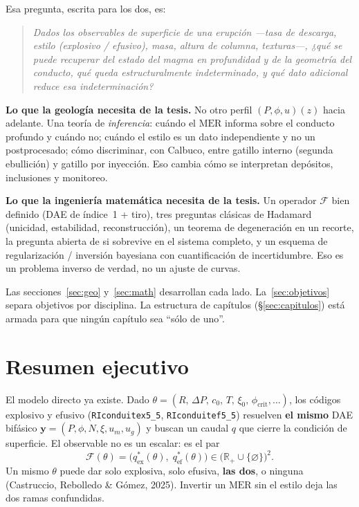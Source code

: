 \documentclass[11pt,a4paper]{article}
\theoremstyle{plain}
\theoremstyle{definition}
\theoremstyle{remark}
\newcommand{\MER}{\mathrm{MER}}
\newcommand{\F}{\mathcal{F}}
\newcommand{\R}{\mathbb{R}}
\begin{document}
Esa pregunta, escrita para los dos, es:

\begin{quote}
\textit{Dados los observables de superficie de una erupción ---tasa de
descarga, estilo (explosivo / efusivo), masa, altura de columna, texturas---,
¿qué se puede recuperar del estado del magma en profundidad y de la
geometría del conducto, qué queda estructuralmente indeterminado, y qué
dato adicional reduce esa indeterminación?}
\end{quote}

\textbf{Lo que la geología necesita de la tesis.} No otro perfil
$(P,\phi,u)(z)$ hacia adelante. Una teoría de \emph{inferencia}:
cuándo el $\MER$ informa sobre el conducto profundo y cuándo no; cuándo
el estilo es un dato independiente y no un postprocesado; cómo
discriminar, con Calbuco, entre gatillo interno (segunda ebullición) y
gatillo por inyección. Eso cambia cómo se interpretan depósitos,
inclusiones y monitoreo.

\textbf{Lo que la ingeniería matemática necesita de la tesis.} Un
operador $\F$ bien definido (DAE de índice~1 + tiro), tres preguntas
clásicas de Hadamard (unicidad, estabilidad, reconstrucción), un
teorema de degeneración en un recorte, la pregunta abierta de si
sobrevive en el sistema completo, y un esquema de regularización /
inversión bayesiana con cuantificación de incertidumbre. Eso es un
problema inverso de verdad, no un ajuste de curvas.

Las secciones~\ref{sec:geo} y~\ref{sec:math} desarrollan cada lado.
La~\ref{sec:objetivos} separa objetivos por disciplina. La
estructura de capítulos (\S\ref{sec:capitulos}) está armada para que
ningún capítulo sea ``sólo de uno''.

\section{Resumen ejecutivo}
\label{sec:resumen}

El modelo directo ya existe. Dado
$\theta=(R,\,\Delta P,\,c_0,\,T,\,\xi_0,\,\phi_{\mathrm{crit}},\ldots)$,
los códigos explosivo y efusivo
(\texttt{RIconduitex5\_5}, \texttt{RIconduitef5\_5})
resuelven \textbf{el mismo} DAE bifásico
$\mathbf{y}=(P,\phi,N,\xi,u_m,u_g)$
y buscan un caudal $q$ que cierre la condición de superficie. El
observable no es un escalar: es el par
\begin{equation}
\label{eq:Fpar}
\F(\theta)
=\bigl(q_{\mathrm{ex}}^\ast(\theta),\;q_{\mathrm{ef}}^\ast(\theta)\bigr)
\in
\bigl(\R_+\cup\{\varnothing\}\bigr)^2.
\end{equation}
Un mismo $\theta$ puede dar solo explosiva, solo efusiva, \textbf{las
dos}, o ninguna (Castruccio, Rebolledo \& Gómez, 2025). Invertir un
$\MER$ sin el estilo deja las dos ramas confundidas.
\end{document}

